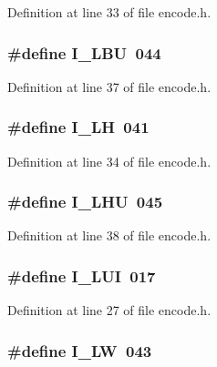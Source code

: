 Definition at line 33 of file encode.\+h.

\subsubsection[{I\+\_\+\+L\+BU}]{\setlength{\rightskip}{0pt plus 5cm}\#define I\+\_\+\+L\+BU~044}\label{encode_8h_a7b1826b6ca85e2c0b7105e7d7e72e39e}


Definition at line 37 of file encode.\+h.

\subsubsection[{I\+\_\+\+LH}]{\setlength{\rightskip}{0pt plus 5cm}\#define I\+\_\+\+LH~041}\label{encode_8h_aca97494fdb7425d20fb671ceea20c2a3}


Definition at line 34 of file encode.\+h.

\subsubsection[{I\+\_\+\+L\+HU}]{\setlength{\rightskip}{0pt plus 5cm}\#define I\+\_\+\+L\+HU~045}\label{encode_8h_ad77a2f143ddcbd9a892c1775e1c8c759}


Definition at line 38 of file encode.\+h.

\subsubsection[{I\+\_\+\+L\+UI}]{\setlength{\rightskip}{0pt plus 5cm}\#define I\+\_\+\+L\+UI~017}\label{encode_8h_ae863492ac09208c49a4e8aeab1bfb409}


Definition at line 27 of file encode.\+h.

\subsubsection[{I\+\_\+\+LW}]{\setlength{\rightskip}{0pt plus 5cm}\#define I\+\_\+\+LW~043}\label{encode_8h_ace53b94a6d86cbc431688c667d96c235}


